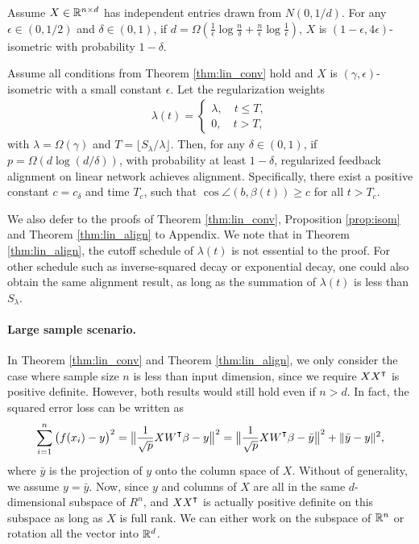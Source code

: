 \begin{proposition}
\label{prop:isom}
Assume $X\in\mathbb{R}^{n\times d}$ has independent entries drawn from $N(0,1/d)$. For any $\epsilon \in (0,1/2)$ and $\delta \in (0,1)$, if $d=\Omega(\frac{1}{\epsilon}\log\frac{n}{\delta}+\frac{n}{\epsilon}\log \frac{1}{\epsilon})$, $X$ is $(1-\epsilon, 4\epsilon)$-isometric with probability $1-\delta$.
\end{proposition}

\begin{theorem}
\label{thm:lin_align}
Assume all conditions from Theorem \ref{thm:lin_conv} hold and $X$ is $(\gamma, \epsilon)$-isometric with a small constant $\epsilon$. Let the regularization weights
\begin{align*}
\lambda(t) = 
\begin{cases}
    \lambda, \quad t\leq T,\\
    0, \quad t > T,
\end{cases}
\end{align*}
with $\lambda=\Omega(\gamma)$ and $T = \lfloor S_\lambda/\lambda\rfloor$. Then, for any $\delta\in(0,1)$, if $p = \Omega(d\log(d/\delta))$, with probability at least $1-\delta$, regularized feedback alignment on linear network achieves alignment. Specifically, there exist a positive constant $c=c_\delta$ and time $T_c$, such that $\cos\angle(b, \beta(t))\geq c$ for all $t>T_c$.
\end{theorem}

We also defer to the proofs of Theorem \ref{thm:lin_conv}, Proposition \ref{prop:isom} and Theorem \ref{thm:lin_align} to Appendix. We note that in Theorem \ref{thm:lin_align}, the cutoff schedule of $\lambda(t)$ is not essential to the proof. For other schedule such as inverse-squared decay or exponential decay, one could also obtain the same alignment result, as long as the summation of $\lambda(t)$ is less than $S_\lambda$.

\paragraph{Large sample scenario.} In Theorem \ref{thm:lin_conv} and Theorem \ref{thm:lin_align}, we only consider the case where sample size $n$ is less than input dimension, since we require $XX\transpose$ is positive definite. However, both results would still hold even if $n>d$. In fact, the squared error loss can be written as
\begin{equation*}
\sum_{i=1}^n\big(f(x_i)-y\big)^2 = \big\|\frac{1}{\sqrt{p}}XW\transpose\beta-y\big\|^2 = \big\|\frac{1}{\sqrt{p}}XW\transpose\beta-\bar{y}\big\|^2+ \|\bar{y}-y\|^2,
\end{equation*}
where $\bar{y}$ is the projection of $y$ onto the column space of $X$. Without of generality, we assume $y=\bar{y}$. Now, since $y$ and columns of $X$ are all in the same $d$-dimensional subspace of $R^n$, and $XX\transpose$ is actually positive definite on this subspace as long as $X$ is full rank. We can either work on the subspace of ${\mathbb{R}^n}$ or rotation all the vector into ${\mathbb{R}^{d}}$.


